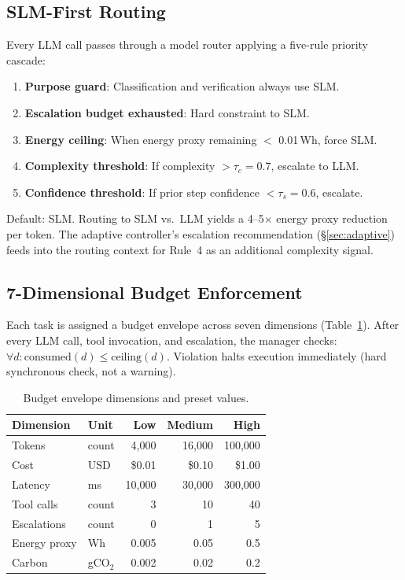 \documentclass[sigconf,authordraft]{acmart}
\begin{document}
\subsection{SLM-First Routing}
\label{sec:routing}

Every LLM call passes through a model router applying a five-rule priority cascade:

\begin{enumerate}[leftmargin=2em,itemsep=2pt]
  \item \textbf{Purpose guard}: Classification and verification always use SLM.
  \item \textbf{Escalation budget exhausted}: Hard constraint to SLM.
  \item \textbf{Energy ceiling}: When energy proxy remaining $<$ 0.01\,Wh, force SLM.
  \item \textbf{Complexity threshold}: If complexity $> \tau_c = 0.7$, escalate to LLM.
  \item \textbf{Confidence threshold}: If prior step confidence $< \tau_s = 0.6$, escalate.
\end{enumerate}

\noindent Default: SLM. Routing to SLM vs.\ LLM yields a 4--5$\times$ energy proxy reduction per token.
The adaptive controller's escalation recommendation (\S\ref{sec:adaptive}) feeds into the routing context for Rule~4 as an additional complexity signal.


\subsection{7-Dimensional Budget Enforcement}
\label{sec:budget}

Each task is assigned a budget envelope across seven dimensions (Table~\ref{tab:budget-presets}).
After every LLM call, tool invocation, and escalation, the manager checks:
$\forall d: \text{consumed}(d) \leq \text{ceiling}(d)$.
Violation halts execution immediately (hard synchronous check, not a warning).

\begin{table}[h]
\centering
\caption{Budget envelope dimensions and preset values.}
\label{tab:budget-presets}
\begin{tabular}{llrrr}
\toprule
Dimension & Unit & Low & Medium & High \\
\midrule
Tokens         & count   & 4{,}000   & 16{,}000  & 100{,}000 \\
Cost           & USD     & \$0.01    & \$0.10    & \$1.00    \\
Latency        & ms      & 10{,}000  & 30{,}000  & 300{,}000 \\
Tool calls     & count   & 3         & 10        & 40        \\
Escalations    & count   & 0         & 1         & 5         \\
Energy proxy   & Wh      & 0.005     & 0.05      & 0.5       \\
Carbon         & gCO$_2$ & 0.002     & 0.02      & 0.2       \\
\bottomrule
\end{tabular}
\end{table}
\end{document}
